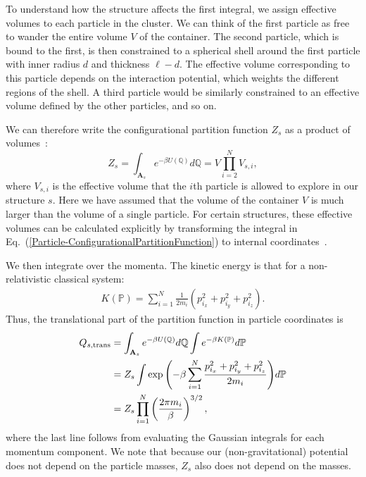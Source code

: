 \documentclass[pre, aps, twocolumn, reprint, amsmath,amssymb, showpacs,
superscriptaddress] {revtex4-1}
\begin{document}
To understand how the structure affects the first integral, we assign
effective volumes to each particle in the cluster. We can think of the
first particle as free to wander the entire volume $V$ of the container.
The second particle, which is bound to the first, is then constrained to
a spherical shell around the first particle with inner radius $d$ and
thickness $\ell-d$. The effective volume corresponding to this particle
depends on the interaction potential, which weights the different
regions of the shell. A third particle would be similarly constrained to
an effective volume defined by the other particles, and so on.

We can therefore write the configurational partition function $Z_s$ as a
product of volumes~\cite{herschbach59}:
\begin{equation}\label{Particle-ConfigurationalPartitionFunction}
	Z_s = \int_{\mathbf{A}_s}{e^{-\beta U(\mathbb{Q})}}d\mathbb{Q} =  V\prod_{i=2}^{N}V_{s,i},
\end{equation}
where $V_{s,i}$ is the effective volume that the $i$th particle is
allowed to explore in our structure $s$. Here we have assumed that the
volume of the container $V$ is much larger than the volume of a single
particle. For certain structures, these effective volumes can be
calculated explicitly by transforming the integral in
Eq.~(\ref{Particle-ConfigurationalPartitionFunction}) to internal
coordinates~\cite{herschbach59, boresch96}.

We then integrate over the momenta. The kinetic energy is that for a
non-relativistic classical system:
\begin{equation*}\label{Particle-TranslationalKineticEnergy}
	\begin{split}
    K(\mathbb{P}) =\sum_{i=1}^{N} {\frac{1}{2 m_i} (p_{i_x}^2+p_{i_y}^2+p_{i_z}^2)}.
    \end{split}
\end{equation*}
Thus, the translational part of the partition function in particle
coordinates is
\begin{equation}\label{Particle-TranslationalPartitionFunction}
	\begin{split}
		Q_{s, \textnormal{trans}} & = \int_{\mathbf{A}_s}{e^{-\beta U(\mathbb{Q})}}d\mathbb{Q} \int{e^{-\beta K(\mathbb{P}) } }d\mathbb{P} \\
    	& = Z_s \int{\exp{\left(-\beta\sum_{i=1}^{N} \frac{p_{i_x}^2+p_{i_y}^2+p_{i_z}^2}{2 m_i}  \right)}}d\mathbb{P} \\
        & = Z_s \prod_{i=1}^{N} \left({\frac{2 \pi m_i}{\beta}} \right)^{3/2},
	\end{split}
\end{equation}
where the last line follows from evaluating the Gaussian integrals for
each momentum component. We note that because our (non-gravitational)
potential does not depend on the particle masses, $Z_s$ also does not
depend on the masses.
\end{document}
